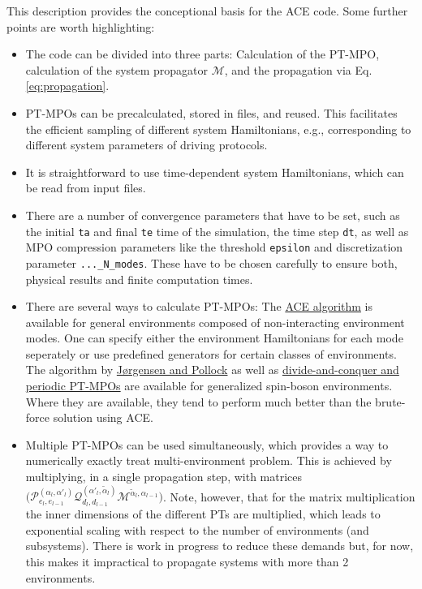\documentclass{scrartcl}
\begin{document}
This description provides the conceptional basis for the ACE code. 
Some further points are worth highlighting:
\begin{itemize}
\item The code can be divided into three parts: Calculation of the PT-MPO,
calculation of the system propagator $\mathcal{M}$, and 
the propagation via Eq.\eqref{eq:propagation}.

\item PT-MPOs can be precalculated, stored in files, and reused. 
This facilitates the efficient sampling of different system Hamiltonians, e.g.,
corresponding to different system parameters of driving protocols.

\item It is straightforward to use time-dependent system Hamiltonians, 
which can be read from input files.

\item There are a number of convergence parameters that have to be set, such as
the initial \verb#ta# and final \verb#te# time of the simulation, the time step
\verb#dt#, as well as MPO compression parameters like the threshold \verb#epsilon# and discretization parameter \verb#..._N_modes#. These have to be chosen
carefully to ensure both, physical results and finite computation times.

\item There are several ways to calculate PT-MPOs:
The \href{https://doi.org/10.1038/s41567-022-01544-9}{ACE algorithm}
is available for general environments composed of non-interacting environment
modes. One can specify either the environment Hamiltonians for 
each mode seperately or use predefined generators for certain classes of
environments.
The algorithm by
\href{https://doi.org/10.1103/PhysRevLett.123.240602}{J{\o}rgensen and Pollock}
as well as 
\href{https://doi.org/10.48550/arXiv.2304.05291}{divide-and-conquer and periodic PT-MPOs} 
are available for generalized spin-boson environments. Where they are available,
they tend to perform much better than the brute-force solution using ACE.

\item Multiple PT-MPOs can be used simultaneously, which provides a way
to numerically exactly treat multi-environment problem. 
This is achieved by multiplying, in a single propagation step, with matrices
$\big( \mathcal{P}^{(\alpha_l,\alpha'_l)}_{e_l,e_{l-1}}
\mathcal{Q}^{(\alpha'_l, \tilde{\alpha}_l)}_{d_l,d_{l-1}} 
\mathcal{M}^{\tilde{\alpha}_l,\alpha_{l-1}}\big)$.
Note, however, that for the matrix multiplication the inner dimensions of
the different PTs are multiplied, which leads to exponential scaling with 
respect to the number of environments (and subsystems). There is work in
progress to reduce these demands but, for now, this makes it impractical
to propagate systems with more than 2 environments.


\end{itemize}
\end{document}
